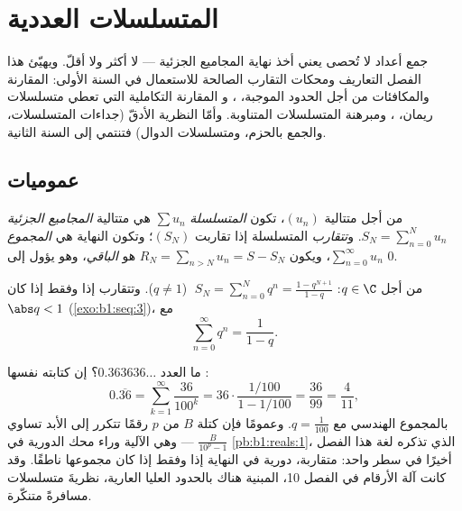 \chapter{المتسلسلات العددية}\label{ch:b1:series}

جمع أعداد لا تُحصى يعني أخذ نهاية المجاميع
الجزئية --- لا أكثر ولا أقلّ. ويهيّئ هذا الفصل
التعاريف ومحكات التقارب الصالحة للاستعمال في السنة الأولى:
المقارنة والمكافئات من أجل الحدود الموجبة، ، و
المقارنة التكاملية التي تعطي متسلسلات ريمان، ،
ومبرهنة المتسلسلات المتناوبة. وأمّا النظرية الأدقّ (جداءات
المتسلسلات، والجمع بالحزم، ومتسلسلات الدوال) فتنتمي إلى
السنة الثانية.

\section{عموميات}

\begin{definition}\label{def:b1:series:def}
من أجل متتالية $(u_n)$، تكون \emph{المتسلسلة} $\sum u_n$
هي متتالية \emph{المجاميع الجزئية} $S_N = \sum_{n=0}^{N} u_n$.
و\emph{تتقارب} المتسلسلة إذا تقاربت $(S_N)$؛ وتكون النهاية هي
\emph{المجموع} $\sum_{n=0}^{\infty} u_n$، ويكون $R_N = \sum_{n > N} u_n =
S - S_N$ هو \emph{الباقي}، وهو يؤول إلى $0$.
\end{definition}

\begin{example}\label{ex:b1:series:geometric}
من أجل $q \in \C$: $\;S_N = \sum_{n=0}^{N} q^n = \frac{1 -
q^{N+1}}{1-q}$ ($q \neq 1$). وتتقارب  إذا وفقط إذا كان $\abs q < 1$
(\cref{exo:b1:seq:3})، مع
\[
\sum_{n=0}^{\infty} q^n = \frac{1}{1 - q} .
\]
\end{example}

\begin{example}\label{ex:b1:series:periodicdecimal}
ما العدد $0.363636\dots$؟ إن كتابته نفسها :
\[
0.\overline{36} = \sum_{k=1}^{\infty} \frac{36}{100^k}
= 36\cdot\frac{1/100}{1 - 1/100} = \frac{36}{99} =
\frac{4}{11} ,
\]
بالمجموع الهندسي مع $q = \frac{1}{100}$. وعمومًا فإن
كتلة $B$ من $p$ رقمًا تتكرر إلى الأبد تساوي
$\frac{B}{10^p - 1}$ --- وهي الآلية وراء محك الدورية
في \cref{pb:b1:reals:1}، الذي تذكره لغة هذا الفصل
أخيرًا في سطر واحد:  
متقاربة، دورية في النهاية إذا وفقط إذا كان مجموعها ناطقًا.
وقد كانت آلة الأرقام في الفصل 10، المبنية هناك بالحدود
العليا العارية، نظريةَ متسلسلات مسافرةً متنكّرة.
\end{example}

